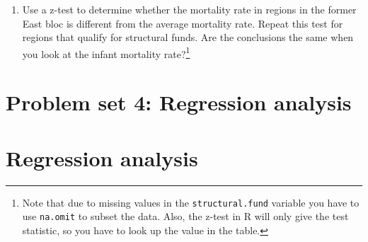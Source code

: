 \documentclass{tufte-handout}
\begin{document}
\begin{enumerate}
  \item Use a z-test to determine whether the mortality rate in regions in the former East bloc is different from the average mortality rate.
  Repeat this test for regions that qualify for structural funds. Are the conclusions the same when you look at the infant mortality rate?\footnote{Note that due to missing values in the \texttt{structural.fund} variable you have to use \texttt{na.omit} to subset the data. 
  Also, the z-test in R will only give the test statistic, so you have to look up the value in the table.}
\end{enumerate}

\clearpage

\section{Problem set 4: Regression analysis}
\section{Regression analysis}
\end{document}
